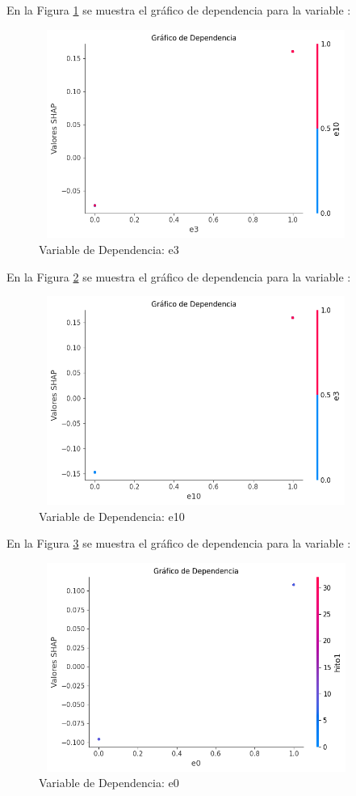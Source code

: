 En la Figura \ref{fig:dependencia_e3_lr} se muestra el gráfico de dependencia para la variable :

\begin{figure}[H]
    \centering
    \includegraphics[width=4.0611in,height=2.6861in]{img/shap_lr/e3.png}
    \caption{Variable de Dependencia: e3}
    \label{fig:dependencia_e3_lr}
\end{figure}

En la Figura \ref{fig:dependencia_e10_lr} se muestra el gráfico de dependencia para la variable :

\begin{figure}[H]
    \centering
    \includegraphics[width=4.0611in,height=2.6861in]{img/shap_lr/e10.png}
    \caption{Variable de Dependencia: e10}
    \label{fig:dependencia_e10_lr}
\end{figure}

En la Figura \ref{fig:dependencia_e0_lr} se muestra el gráfico de dependencia para la variable :

\begin{figure}[H]
    \centering
    \includegraphics[width=4.0611in,height=2.6861in]{img/shap_lr/e0.png}
    \caption{Variable de Dependencia: e0}
    \label{fig:dependencia_e0_lr}
\end{figure}


